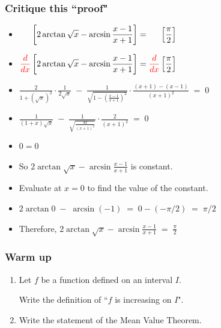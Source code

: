 \documentclass[14pt]{beamer}
\begin{document}
\begin{frame}[t]
	\fontsize{12}{12}\selectfont
	\frametitle{Critique this ``proof"}
	\begin{itemize}
		\item $\displaystyle \phantom{{\color{red} \frac{d}{dx}}}\left[ 2 \arctan \sqrt{x}
			- \arcsin \frac{x-1}{x+1}\right] = \phantom{{\color{red} \frac{d}{dx}}}\left
			[ \frac{\pi}{2}\right]$

		\item $\displaystyle{\color{red} \frac{d}{dx}}\left[ 2 \arctan \sqrt{x}- \arcsin
			\frac{x-1}{x+1}\right] ={\color{red} \frac{d}{dx}}\left[ \frac{\pi}{2}\right
			]$

		\item $\displaystyle \frac{2}{1+ \left( \sqrt{x}\right)^{2}}\cdot \frac{1}{2\sqrt{x}}
			\; - \; \frac{1}{\sqrt{1- \left( \frac{x-1}{x+1}\right)^{2}}}\cdot \frac{(x+1)
			- (x-1)}{(x+1)^{2}}\; = \; 0$

		\item $\displaystyle \frac{1}{(1+ x)\sqrt{x} }\; - \; \frac{1}{ \sqrt{\frac{4x}{(x+1)^{2}}
			}}\cdot \frac{2}{(x+1)^{2}}\; = \; 0$

		\item $\displaystyle 0 = 0$

		\item So $\displaystyle 2 \arctan \sqrt{x}- \arcsin \frac{x-1}{x+1}$ is constant.

		\item Evaluate at $x=0$ to find the value of the constant.

		\item $\displaystyle 2 \arctan 0 \; - \; \arcsin (-1) \; = \; 0 - \left( - \pi
			/2 \right) \; = \; \pi/2$

		\item Therefore, \;
			$\displaystyle 2 \arctan \sqrt{x}- \arcsin \frac{x-1}{x+1}\; = \; \frac{\pi}{2}$
	\end{itemize}
\end{frame}

\begin{frame}[t]
	\frametitle{Warm up}

	\begin{enumerate}
		\item Let $f$ be a function defined on an interval $I$.

			Write the definition of ``$f$ is increasing on $I$".

		\item Write the statement of the Mean Value Theorem.
	\end{enumerate}
\end{frame}
\end{document}
